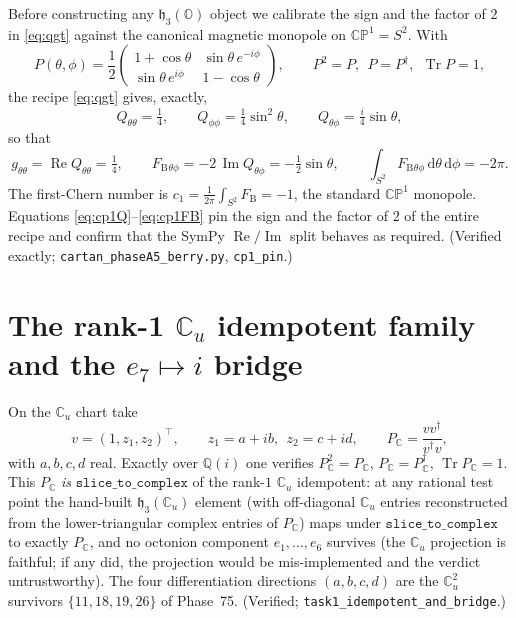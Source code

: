 \documentclass[11pt]{article}
\newcommand{\Tr}{\operatorname{Tr}}
\renewcommand{\Re}{\operatorname{Re}}
\renewcommand{\Im}{\operatorname{Im}}
\newcommand{\dd}{\mathrm{d}}
\newcommand{\Cu}{\mathbb{C}_u}
\newcommand{\HO}{\mathfrak{h}_3(\mathbb{O})}
\newcommand{\HCu}{\mathfrak{h}_3(\Cu)}
\newcommand{\FB}{F_{\mathrm{B}}}
\theoremstyle{plain}
\theoremstyle{definition}
\begin{document}
Before constructing any $\HO$ object we calibrate the sign and the factor of $2$ in
\eqref{eq:qgt} against the canonical magnetic monopole on
$\mathbb{CP}^1=S^2$. With
\begin{equation}
  P(\theta,\phi)=\frac12
  \begin{pmatrix} 1+\cos\theta & \sin\theta\,e^{-i\phi}\\[2pt]
                  \sin\theta\,e^{i\phi} & 1-\cos\theta \end{pmatrix},
  \qquad P^2=P,\ \ P=P^\dagger,\ \ \Tr P=1,
\end{equation}
the recipe \eqref{eq:qgt} gives, exactly,
\begin{equation}
  Q_{\theta\theta}=\tfrac14,\qquad
  Q_{\phi\phi}=\tfrac14\sin^2\theta,\qquad
  Q_{\theta\phi}=\tfrac{i}{4}\sin\theta,
  \label{eq:cp1Q}
\end{equation}
so that
\begin{equation}
  g_{\theta\theta}=\Re Q_{\theta\theta}=\tfrac14,
  \qquad
  \FB{}_{\theta\phi}=-2\,\Im Q_{\theta\phi}=-\tfrac12\sin\theta,
  \qquad
  \int_{S^2}\FB{}_{\theta\phi}\,\dd\theta\,\dd\phi=-2\pi .
  \label{eq:cp1FB}
\end{equation}
The first-Chern number is $c_1=\tfrac{1}{2\pi}\int_{S^2}\FB=-1$, the standard
$\mathbb{CP}^1$ monopole. Equations \eqref{eq:cp1Q}--\eqref{eq:cp1FB} pin the sign and
the factor of $2$ of the entire recipe and confirm that the SymPy $\Re/\Im$ split
behaves as required. (Verified exactly; \texttt{cartan\_phaseA5\_berry.py},
\texttt{cp1\_pin}.)

\section{The rank-1 $\Cu$ idempotent family and the $e_7\mapsto i$ bridge}
\label{sec:family}

On the $\Cu$ chart take
\begin{equation}
  v=(1,z_1,z_2)^{\!\top},\qquad z_1=a+ib,\ \ z_2=c+id,
  \qquad
  P_{\mathbb{C}}=\frac{vv^\dagger}{v^\dagger v},
  \label{eq:family}
\end{equation}
with $a,b,c,d$ real. Exactly over $\mathbb{Q}(i)$ one verifies $P_{\mathbb{C}}^2=P_{\mathbb{C}}$,
$P_{\mathbb{C}}=P_{\mathbb{C}}^\dagger$, $\Tr P_{\mathbb{C}}=1$. This $P_{\mathbb{C}}$ \emph{is}
$\texttt{slice\_to\_complex}$ of the rank-$1$ $\Cu$ idempotent: at any rational test
point the hand-built $\HCu$ element (with off-diagonal $\Cu$ entries reconstructed
from the lower-triangular complex entries of $P_{\mathbb{C}}$) maps under
$\texttt{slice\_to\_complex}$ to exactly $P_{\mathbb{C}}$, and no octonion component
$e_1,\dots,e_6$ survives (the $\Cu$ projection is faithful; if any did, the
projection would be mis-implemented and the verdict untrustworthy). The four
differentiation directions $(a,b,c,d)$ are the $\Cu^2$ survivors $\{11,18,19,26\}$ of
Phase~75. (Verified; \texttt{task1\_idempotent\_and\_bridge}.)
\end{document}
